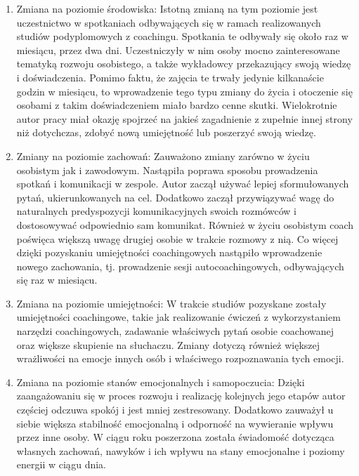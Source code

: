 \begin{enumerate}
  \item Zmiana na poziomie środowiska: Istotną zmianą na tym poziomie jest uczestnictwo w spotkaniach odbywających się
      w ramach realizowanych studiów podyplomowych z coachingu. Spotkania te odbywały się około raz w miesiącu, przez dwa dni.
      Uczestniczyły w nim osoby mocno zainteresowane tematyką rozwoju osobistego, a także wykładowcy przekazujący swoją
      wiedzę i doświadczenia. Pomimo faktu, że zajęcia te trwały jedynie kilkanaście godzin w miesiącu, to wprowadzenie
      tego typu zmiany do życia i otoczenie się osobami z takim doświadczeniem miało bardzo cenne skutki. Wielokrotnie
      autor pracy miał okazję spojrzeć na jakieś zagadnienie z zupełnie innej strony niż dotychczas, zdobyć nową umiejętność
      lub poszerzyć swoją wiedzę.

  \item Zmiany na poziomie zachowań: Zauważono zmiany zarówno w życiu osobistym jak i zawodowym. Nastąpiła poprawa sposobu
      prowadzenia spotkań i komunikacji w zespole. Autor zaczął używać lepiej sformułowanych pytań, ukierunkowanych na cel.
      Dodatkowo zaczął przywiązywać wagę do naturalnych predyspozycji komunikacyjnych swoich rozmówców i dostosowywać
      odpowiednio sam komunikat. Również w życiu osobistym coach poświęca większą uwagę drugiej osobie w trakcie rozmowy
      z nią. Co więcej dzięki pozyskaniu umiejętności coachingowych nastąpiło wprowadzenie nowego zachowania, tj. prowadzenie
      sesji autocoachingowych, odbywających się raz w miesiącu.

  \item Zmiana na poziomie umiejętności: W trakcie studiów pozyskane zostały umiejętności coachingowe, takie jak realizowanie
      ćwiczeń z wykorzystaniem narzędzi coachingowych, zadawanie właściwych pytań osobie coachowanej oraz większe skupienie na
      słuchaczu. Zmiany dotyczą również większej wrażliwości na emocje innych osób i właściwego rozpoznawania tych emocji.

  \item Zmiana na poziomie stanów emocjonalnych i samopoczucia: Dzięki zaangażowaniu się w proces rozwoju i realizację kolejnych
      jego etapów autor częściej odczuwa spokój i jest mniej zestresowany. Dodatkowo zauważył u siebie większa stabilność emocjonalną
      i odporność na wywieranie wpływu przez inne osoby. W ciągu roku poszerzona została świadomość dotycząca własnych zachowań, nawyków
      i ich wpływu na stany emocjonalne i poziomy energii w ciągu dnia.


\end{enumerate}
